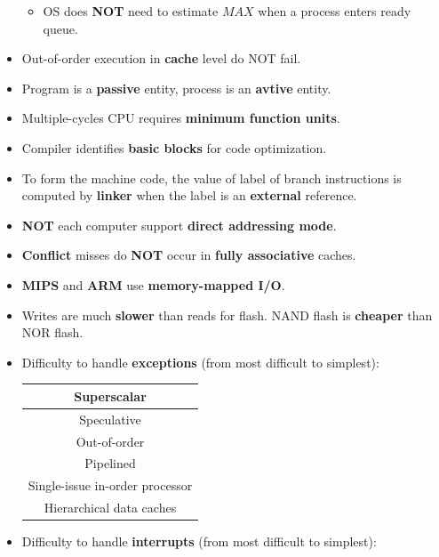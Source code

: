 \begin{itemize}
\begin{itemize}
        \item OS does \textbf{NOT} need to estimate $MAX$ when a process enters ready queue.
    \end{itemize}
    \item Out-of-order execution in \textbf{cache} level do NOT fail.
    \item Program is a \textbf{passive} entity, process is an \textbf{avtive} entity.
    \item Multiple-cycles CPU requires \textbf{minimum function units}.
    \item Compiler identifies \textbf{basic blocks} for code optimization.
    \item To form the machine code, the value of label of branch instructions is computed by \textbf{linker} when the label is an \textbf{external} reference.
    \item \textbf{NOT} each computer support \textbf{direct addressing mode}.
    \item \textbf{Conflict} misses do \textbf{NOT} occur in \textbf{fully associative} caches.
    \item \textbf{MIPS} and \textbf{ARM} use \textbf{memory-mapped I/O}.
    \item Writes are much \textbf{slower} than reads for flash. NAND flash is \textbf{cheaper} than NOR flash.
    \item Difficulty to handle \textbf{exceptions} (from most difficult to simplest): \begin{table}[H]
        \centering
        \begin{tabular}{|c|}
            \hline
            Superscalar \\
            \hline
            Speculative \\
            \hline
            Out-of-order \\
            \hline
            Pipelined \\
            \hline
            Single-issue in-order processor \\
            \hline
            Hierarchical data caches \\
            \hline
        \end{tabular}
    \end{table}
    \item Difficulty to handle \textbf{interrupts} (from most difficult to simplest): \begin{table}[H]
        \centering
        \begin{tabular}{|c|}
            \hline

\end{tabular}
\end{table}
\end{itemize}
